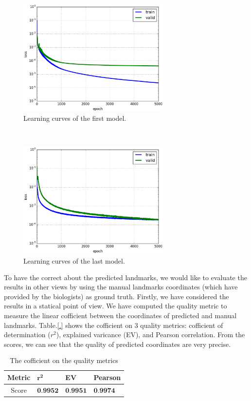 \documentclass{article} %
\begin{document}
\begin{multicols}{2}
\begin{figure}[H]
	\centerline{\includegraphics[height=2.3in]{images/loss_model_1.eps}}
	\caption{Learning curves of the first model.}
	\label{figloss1}
\end{figure}~\\
\begin{figure}[H]
	\centerline{\includegraphics[height=2.3in]{images/loss_v16.eps}}
	\caption{Learning curves of the last model.}
	\label{figloss}
\end{figure}

To have the correct about the predicted landmarks, we would like to evaluate the results in other views by using the manual landmarks coordinates (which have provided by the biologists) as ground truth. Firstly, we have considered the results in a statical point of view. We have computed the quality metric to measure the linear cofficient between the coordinates of predicted and manual landmarks. Table.\ref{.} shows the cofficient on $3$ quality metrics: cofficient of determination ($r^2$), explained varicance (EV), and Pearson correlation. From the scores, we can see that the quality of predicted coordinates are very precise.

\begin{table}[H]
	\centering
	\begin{tabular}{|c|p{1cm}|p{1cm}|p{1.5cm}|}
		\hline
		Metric & $\mathbf{r^{2}}$ & \textbf{EV} & \textbf{Pearson} \\ \hline
		Score & $\textbf{0.9952}$ & $\textbf{0.9951}$ & $\textbf{0.9974}$ \\ \hline
	\end{tabular}
	\label{table1}
	\caption{The cofficient on the quality metrics}
\end{table}


\end{multicols}
\end{document}
